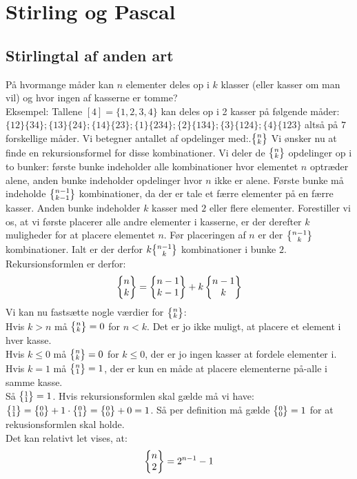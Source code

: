 \chapter{Stirling og Pascal}
\section{Stirlingtal af anden art}
På hvormange måder kan \(n\) elementer deles op i \(k\) klasser (eller kasser om man vil) og hvor ingen af kasserne er tomme?\\
Eksempel: Tallene \([4]=\{1,2,3,4\}\) kan deles op i 2 kasser på følgende måder: \(
\{12\} \{34\};\{13\} \{24\};\{14\} \{23\};\{1\} \{234\};\{2\} \{134\};\{3\} \{124\};\{4\} \{123\}
\) altså på \(7\) forskellige måder. Vi betegner antallet af opdelinger med:.\( \bigl\{ \negthinspace \begin{smallmatrix} n\\k \end{smallmatrix} \negthinspace \bigr\} \)
Vi ønsker nu at finde en rekursionsformel for disse kombinationer. Vi deler de \( \bigl\{ \negthinspace \begin{smallmatrix} n\\k \end{smallmatrix} \negthinspace \bigr\}\) opdelinger op i to bunker: første bunke indeholder alle kombinationer hvor elementet \(n\) optræder alene, anden bunke indeholder opdelinger hvor \(n\) ikke er alene. Første bunke må indeholde \( \bigl\{ \negthinspace \begin{smallmatrix} n-1\\k-1 \end{smallmatrix} \negthinspace \bigr\}\) kombinationer, da der er tale et færre elementer på en færre kasser. Anden bunke indeholder \(k\) kasser med \(2\) eller flere elementer. Forestiller vi os, at vi første placerer alle andre elementer i kasserne, er der derefter \(k\) muligheder for at placere elementet \(n\). Før placeringen af \(n\) er der \( \bigl\{ \negthinspace \begin{smallmatrix} n-1\\k \end{smallmatrix} \negthinspace \bigr\}\) kombinationer. Ialt er der derfor \( k \bigl\{ \negthinspace \begin{smallmatrix} n-1\\k \end{smallmatrix} \negthinspace \bigr\}\) kombinationer i bunke \(2\). Rekursionsformlen er derfor:
\[\begin{Bmatrix} n\\k \end{Bmatrix}=\begin{Bmatrix} n-1\\k-1 \end{Bmatrix}+k\begin{Bmatrix} n-1\\k \end{Bmatrix}\]
Vi kan nu fastsætte nogle værdier for \(\bigl\{ \negthinspace \begin{smallmatrix} n\\k \end{smallmatrix} \negthinspace \bigr\}\):\\
Hvis \(k>n\) må \(\bigl\{ \negthinspace \begin{smallmatrix} n\\k \end{smallmatrix} \negthinspace \bigr\}=0\) for \(n<k\). Det er jo ikke muligt, at placere et element i hver kasse.\\
Hvis \(k \leq0\) må \(\bigl\{ \negthinspace \begin{smallmatrix} n\\k \end{smallmatrix} \negthinspace \bigr\}=0\) for \(k \leq0\), der er jo ingen kasser at fordele elementer i.\\
Hvis \(k=1\) må \(\bigl\{ \negthinspace \begin{smallmatrix} n\\1 \end{smallmatrix} \negthinspace \bigr\}=1\), der er kun en måde at placere elementerne på-alle i samme kasse.\\
Så \( \bigl\{ \negthinspace \begin{smallmatrix} 1\\1 \end{smallmatrix} \negthinspace \bigr\}=1\). Hvis rekursionsformlen skal gælde må vi have: \( \StirLine{1}{1}=\StirLine{0}{0}+1 \cdot \StirLine{0}{1}=\StirLine{0}{0}+0=1\). Så per definition må gælde \(\bigl\{ \negthinspace \begin{smallmatrix} 0\\0 \end{smallmatrix} \negthinspace \bigr\}=1\) for at rekusionsformlen skal holde.\\
Det kan relativt let vises, at:
\[\begin{Bmatrix} n\\2 \end{Bmatrix}=2^{n-1}-1\]
